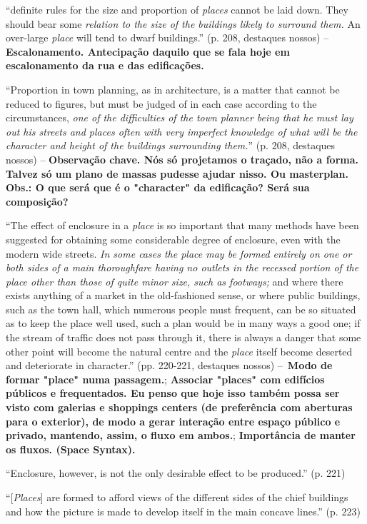 \documentclass[12pt, a4paper]{book} %
\begin{document}
        ``definite rules for the size and proportion of \textit{places} cannot be laid down. They should bear some \textit{relation to the size of the buildings likely to surround them.} An over-large \textit{place} will tend to dwarf buildings.'' (p. 208, destaques nossos) – \textbf{Escalonamento. Antecipação daquilo que se fala hoje em escalonamento da rua e das edificações.}

        ``Proportion in town planning, as in architecture, is a matter that cannot be reduced to figures, but must be judged of in each case according to the circumstances, \textit{one of the difficulties of the town planner being that he must lay out his streets and places often with very imperfect knowledge of what will be the character and height of the buildings surrounding them.}'' (p. 208, destaques nossos) – \textbf{Observação chave. Nós só projetamos o traçado, não a forma. Talvez só um plano de massas pudesse ajudar nisso. Ou masterplan. Obs.: O que será que é o "character" da edificação? Será sua composição?}

        ``The effect of enclosure in a \textit{place} is so important that many methods have been suggested for obtaining some considerable degree of enclosure, even with the modern wide streets. \textit{In some cases the place may be formed entirely on one or both sides of a main thoroughfare having no outlets in the recessed portion of the place other than those of quite minor size, such as footways;} and where there exists anything of a market in the old-fashioned sense, or where public buildings, such as the town hall, which numerous people must frequent, can be so situated as to keep the place well used, such a plan would be in many ways a good one; if the stream of traffic does not pass through it, there is always a danger that some other point will become the natural centre and the \textit{place} itself become deserted and deteriorate in character.'' (pp. 220-221, destaques nossos) – \textbf{Modo de formar "place" numa passagem.}; \textbf{Associar "places" com edifícios públicos e frequentados.
        Eu penso que hoje isso também possa ser visto com galerias e shoppings centers (de preferência com aberturas para o exterior), de modo a gerar interação entre espaço público e privado, mantendo, assim, o fluxo em ambos.}; \textbf{Importância de manter os fluxos. (Space Syntax).}

        ``Enclosure, however, is not the only desirable effect to be produced.'' (p. 221)

        ``[\textit{Places}] are formed to afford views of the different sides of the chief buildings and how the picture is made to develop itself in the main concave lines.'' (p. 223)
\end{document}
